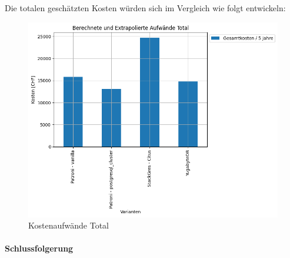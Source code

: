 \begin{flushleft}
    Die totalen geschätzten Kosten würden sich im Vergleich wie folgt entwickeln:
    \begin{figure}[H]
        \centering
        \includegraphics[width=1\linewidth]{source/pandas_data_chart_plotter/cost_investment_summe}
        \caption{Kostenaufwände Total}
        \label{fig:cost_investment_summe}
    \end{figure}
\end{flushleft}
\begin{flushleft}
    \paragraph{Schlussfolgerung}
\end{flushleft}
